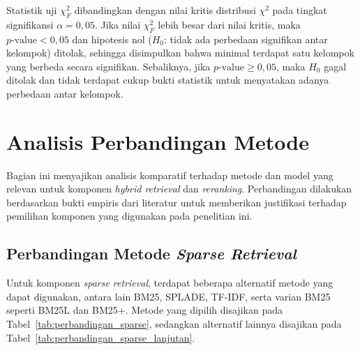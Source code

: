 Statistik uji $\chi_F^2$ dibandingkan dengan nilai kritis distribusi $\chi^2$ pada tingkat signifikansi $\alpha = 0{,}05$. Jika nilai $\chi_F^2$ lebih besar dari nilai kritis, maka $p\text{-value} < 0{,}05$ dan hipotesis nol ($H_0$: tidak ada perbedaan signifikan antar kelompok) ditolak, sehingga disimpulkan bahwa minimal terdapat satu kelompok yang berbeda secara signifikan. Sebaliknya, jika $p\text{-value} \geq 0{,}05$, maka $H_0$ gagal ditolak dan tidak terdapat cukup bukti statistik untuk menyatakan adanya perbedaan antar kelompok.

\section{Analisis Perbandingan Metode}

Bagian ini menyajikan analisis komparatif terhadap metode dan model yang relevan untuk komponen \textit{hybrid retrieval} dan \textit{reranking}. Perbandingan dilakukan berdasarkan bukti empiris dari literatur untuk memberikan justifikasi terhadap pemilihan komponen yang digunakan pada penelitian ini.

\subsection{Perbandingan Metode \textit{Sparse Retrieval}}

Untuk komponen \textit{sparse retrieval}, terdapat beberapa alternatif metode yang dapat digunakan, antara lain BM25, SPLADE, TF-IDF, serta varian BM25 seperti BM25L dan BM25+. Metode yang dipilih disajikan pada Tabel~\ref{tab:perbandingan_sparse}, sedangkan alternatif lainnya disajikan pada Tabel~\ref{tab:perbandingan_sparse_lanjutan}.

